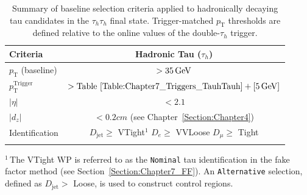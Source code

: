 {
\setlength{\arrayrulewidth}{1pt}

\begin{table}[!htbp]
\centering
\caption[Summary of baseline selection criteria for $\tau_h$ candidates in the $\tau_h\tau_h$ channel.]{
Summary of baseline selection criteria applied to hadronically decaying tau candidates in the $\tau_h\tau_h$ final state. Trigger-matched $p_\text{T}$ thresholds are defined relative to the online values of the double-$\tau_h$ trigger.}
\label{Table:Chapter7_Tauh_SelectionSummary}

\renewcommand{\arraystretch}{1.5}
\setlength{\tabcolsep}{12pt}

\begin{tabular}{lc}
\hline
Criteria & Hadronic Tau ($\tau_h$) \\
\hline
$p_\text{T}$ (baseline) &  $> 35 \,\text{Ge\hspace{-.08em}V}$\\
\arrayrulecolor{lightgray} \hline

$p_\text{T}^{\text{Trigger}}$ & $ > \text{Table~\ref{Table:Chapter7_Triggers_TauhTauh}} + [5\,\text{Ge\hspace{-.08em}V}]$ \\
\arrayrulecolor{lightgray} \hline

$|\eta|$ & $< 2.1$ \\
\arrayrulecolor{lightgray} \hline

$|d_z|$ & $< 0.2\unit{cm}$ (see Chapter~\ref{Section:Chapter4}) \\
\arrayrulecolor{lightgray} \hline

Identification 
& \makecell{
\normalfont\footnotesize$D_{\text{jet}} \geq$ VTight\hyperlink{Alternative-FFcut_CP}{$^1$} \\
\normalfont\footnotesize$D_{e} \geq$ VVLoose \\
\normalfont\footnotesize$D_{\mu} \geq$ Tight
} \\ 
\arrayrulecolor{black} \hline
\end{tabular}
\vspace{0.5em}
\begin{minipage}{0.95\linewidth}
\raggedright
\footnotesize
\hypertarget{Alternative-FFcut_CP}{}$^{1}$\,The VTight \ac{WP} is referred to as the \texttt{Nominal} tau identification in the fake factor method (see Section~\ref{Section:Chapter7_FF}). An \texttt{Alternative} selection, defined as $D_{\text{jet}} >$ Loose, is used to construct control regions.

\end{minipage}
\end{table}
}

